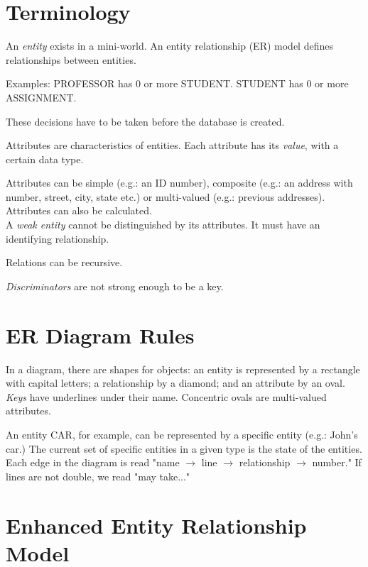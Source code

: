 \documentclass[english,openany]{book}
\begin{document}
    \section{Terminology}

    An \textit{entity} exists in a mini-world. An entity relationship (ER) model defines relationships between entities.

    Examples: PROFESSOR has 0 or more STUDENT. STUDENT has 0 or more ASSIGNMENT.

    These decisions have to be taken before the database is created.

    Attributes are characteristics of entities. Each attribute has its \textit{value}, with a certain data type.

    Attributes can be simple (e.g.: an ID number), composite (e.g.: an address with number, street, city, state etc.) or multi-valued (e.g.: previous addresses). Attributes can also be calculated.\\

    A \textit{weak entity} cannot be distinguished by its attributes. It must have an identifying relationship.

    Relations can be recursive.

    \textit{Discriminators} are not strong enough to be a key.

    \section{ER Diagram Rules}

    In a diagram, there are shapes for objects: an entity is represented by a rectangle with capital letters; a relationship by a diamond; and an attribute by an oval. \textit{Keys} have underlines under their name. Concentric ovals are multi-valued attributes.

    An entity CAR, for example, can be represented by a specific entity (e.g.: John's car.) The current set of specific entities in a given type is the state of the entities.\\

    Each edge in the diagram is read "name $\rightarrow$ line $\rightarrow$ relationship $\rightarrow$ number." If lines are not double, we read "may take..."

    \section{Enhanced Entity Relationship Model}
\end{document}
